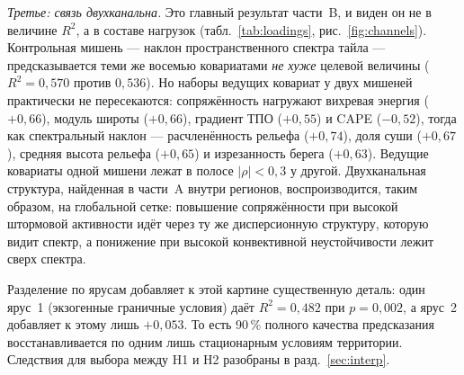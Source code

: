 \documentclass[11pt,a4paper]{article}
\begin{document}
\emph{Третье: связь двухканальна.} Это главный результат части~B, и виден он не в величине $R^2$, а в составе нагрузок (табл.~\ref{tab:loadings}, рис.~\ref{fig:channels}). Контрольная мишень --- наклон пространственного спектра тайла --- предсказывается теми же восемью ковариатами \emph{не хуже} целевой величины ($R^2=0{,}570$ против $0{,}536$). Но наборы ведущих ковариат у двух мишеней практически не пересекаются: сопряжённость нагружают вихревая энергия ($+0{,}66$), модуль широты ($+0{,}66$), градиент ТПО ($+0{,}55$) и CAPE ($-0{,}52$), тогда как спектральный наклон --- расчленённость рельефа ($+0{,}74$), доля суши ($+0{,}67$), средняя высота рельефа ($+0{,}65$) и изрезанность берега ($+0{,}63$). Ведущие ковариаты одной мишени лежат в полосе $\lvert\rho\rvert<0{,}3$ у другой. Двухканальная структура, найденная в части~A внутри регионов, воспроизводится, таким образом, на глобальной сетке: повышение сопряжённости при высокой штормовой активности идёт через ту же дисперсионную структуру, которую видит спектр, а понижение при высокой конвективной неустойчивости лежит сверх спектра.

Разделение по ярусам добавляет к этой картине существенную деталь: один ярус~1 (экзогенные граничные условия) даёт $R^2=0{,}482$ при $p=0{,}002$, а ярус~2 добавляет к этому лишь $+0{,}053$. То есть 90\,\% полного качества предсказания восстанавливается по одним лишь стационарным условиям территории. Следствия для выбора между H1 и H2 разобраны в разд.~\ref{sec:interp}.
\end{document}
